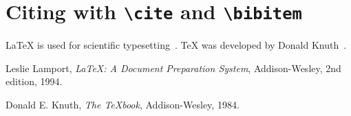 \documentclass{article}
\begin{document}
\section*{Citing with \texttt{\textbackslash cite} and \texttt{\textbackslash bibitem}}

LaTeX is used for scientific typesetting~\cite{lamport}.
TeX was developed by Donald Knuth~\cite{knuth}.

\begin{thebibliography}{9}
    Leslie Lamport,
    \textit{LaTeX: A Document Preparation System},
    Addison-Wesley, 2nd edition, 1994.

    Donald E. Knuth,
    \textit{The TeXbook},
    Addison-Wesley, 1984.
\end{thebibliography}
\end{document}
